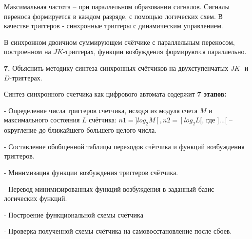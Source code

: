 \documentclass[a4paper,12pt]{article}
\begin{document}
\noindent Максимальная частота -- при параллельном образовании сигналов. Сигналы переноса формируется в каждом разряде, с помощью логических схем. В качестве триггеров - синхронные триггеры с динамическим управлением.\newline

\noindent В синхронном двоичном суммирующем счётчике с параллельным переносом, построенном на $JK$-триггерах, функции возбуждения формируются параллельно.\newline

\clearpage
\noindent\textbf{7. } Объяснить методику синтеза синхронных счётчиков на двухступенчатых $JK$- и $D$-триггерах.\newline

\noindent Синтез синхронного счетчика как цифрового автомата содержит \textbf{7 этапов:} \newline

\noindent - Определение числа триггеров счетчика, исходя из модуля счета $M$ и максимального состояния $L$ счётчика: $n1 = ]log_{2}M[, n2 = ]log_{2}L[$, где $]...[$ -- округление до ближайшего большего целого числа.

\noindent - Составление обобщенной таблицы переходов счётчика и функций возбуждения триггеров.

\noindent - Минимизация функции возбуждения триггеров счётчика.

\noindent - Перевод минимизированных функций возбуждения в заданный базис логических функций.

\noindent - Построение функциональной схемы счётчика

\noindent - Проверка полученной схемы счётчика на самовосстановление после сбоев.
\end{document}
